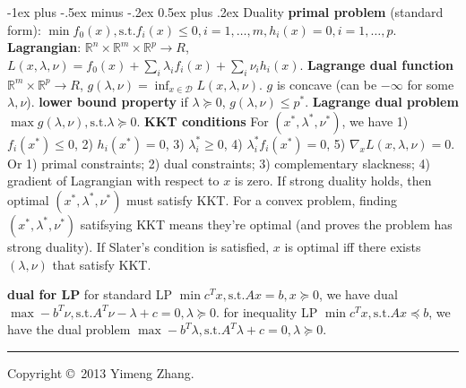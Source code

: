 \documentclass[10pt,landscape]{article}
\makeatletter
\renewcommand{\section}{\@startsection{section}{1}{0mm}%
                                {-1ex plus -.5ex minus -.2ex}%
                                {0.5ex plus .2ex}%
                                {\normalfont\large\bfseries}}
\makeatother
\begin{document}
\begin{multicols}{3}
\section{Duality}
\textbf{primal problem} (standard form): $\min f_0(x), \text{s.t.} f_i(x) \leq 0, i = 1,\ldots,m, h_i(x)=0, i = 1,\ldots,p$.
\textbf{Lagrangian}: $\mathbb{R}^n \times \mathbb{R}^m \times \mathbb{R}^p \rightarrow R$, $L(x,\lambda,\nu) = f_0(x) + \sum_i \lambda_i f_i (x) + \sum_i \nu_i h_i(x)$.
\textbf{Lagrange dual function} $\mathbb{R}^m \times \mathbb{R}^p \rightarrow R$, $g(\lambda, \nu) = \inf_{x \in \mathcal{D}} L(x, \lambda, \nu)$. $g$ is concave (can be $-\infty$ for some $\lambda,\nu$). \textbf{lower bound property} if $\lambda \succeq 0$, $g(\lambda, \nu) \leq p^*$.
\textbf{Lagrange dual problem} $\max g(\lambda,\nu), \text{s.t.} \lambda \succeq 0$. \textbf{KKT conditions} For $(x^*, \lambda^*, \nu^*)$, we have 1) $f_i(x^*) \leq 0$, 2) $h_i(x^*) = 0$, 3) $\lambda^*_i \geq 0$, 4) $\lambda^*_i f_i(x^*) = 0$, 5) $\nabla_x L(x,\lambda,\nu) = 0$. Or 1) primal constraints; 2) dual constraints; 3) complementary slackness; 4) gradient of Lagrangian with respect to $x$ is zero. If strong duality holds, then optimal $(x^*, \lambda^*, \nu^*)$ must satisfy KKT. For a convex problem, finding $(x^*, \lambda^*, \nu^*)$ satifsying KKT means they're optimal (and proves the problem has strong duality). If Slater's condition is satisfied, $x$ is optimal iff there exists $(\lambda, \nu)$ that satisfy KKT.

\textbf{dual for LP} for standard LP $\min c^T x, \text{s.t.} Ax=b, x \succeq 0$, we have dual $\max -b^T \nu, \text{s.t.} A^T\nu - \lambda + c = 0, \lambda \succeq 0$. for inequality LP $\min c^T x, \text{s.t.} Ax\preceq b$, we have the dual problem $\max -b^T \lambda, \text{s.t.} A^T\lambda + c = 0, \lambda \succeq 0$.



\rule{0.3\linewidth}{0.25pt}
\scriptsize

Copyright \copyright\ 2013 Yimeng Zhang.

\end{multicols}
\end{document}
